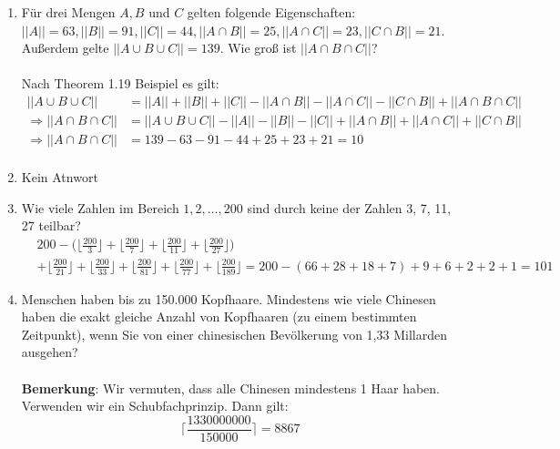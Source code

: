 \begin{enumerate}[label=(\alph*)]
        \item Für drei Mengen $A, B$ und $C$ gelten folgende Eigenschaften: 
        $||A|| = 63, ||B|| = 91, ||C|| = 44, ||A\cap B|| = 25, ||A\cap C|| = 23, ||C \cap B|| = 21$. 
        Außerdem gelte $||A\cup B\cup C|| = 139$. Wie groß ist $||A \cap B \cap C||$?\\\\
        Nach Theorem 1.19 Beispiel es gilt:
        \begin{align*}
	        ||A\cup B\cup C|| &= ||A||+||B||+||C||-||A\cap B||-||A\cap C||-||C \cap B||+||A \cap B \cap C||\\
	        \Rightarrow ||A \cap B \cap C|| &= ||A\cup B\cup C||-||A||-||B||-||C||+||A\cap B||+||A\cap C||+||C \cap B||\\
	        \Rightarrow ||A \cap B \cap C|| &= 139 - 63 - 91 - 44 + 25 + 23 + 21 = 10 \\
        \end{align*}

        \item Kein Atnwort

        \item Wie viele Zahlen im Bereich $1, 2,\ldots, 200$ sind durch keine der Zahlen 3, 7, 11, 27 teilbar?\\
        \begin{align*}
	        &200 - \bigg(\bigg\lfloor\frac{200}{3}\bigg\rfloor + \bigg\lfloor\frac{200}{7}\bigg\rfloor
	         + \bigg\lfloor\frac{200}{11}\bigg\rfloor + \bigg\lfloor\frac{200}{27}\bigg\rfloor \bigg) \\
	         &+  \bigg\lfloor\frac{200}{21}\bigg\rfloor + \bigg\lfloor\frac{200}{33}\bigg\rfloor 
	         + \bigg\lfloor\frac{200}{81}\bigg\rfloor + \bigg\lfloor\frac{200}{77}\bigg\rfloor
	         + \bigg\lfloor\frac{200}{189}\bigg\rfloor
	         = 200 - (66+28+18+7) + 9 + 6 + 2 + 2 + 1= 101
        \end{align*}

        \item Menschen haben bis zu 150.000 Kopfhaare. Mindestens wie viele Chinesen haben die
		exakt gleiche Anzahl von Kopfhaaren (zu einem bestimmten Zeitpunkt), wenn Sie von
		einer chinesischen Bevölkerung von 1,33 Millarden ausgehen?\\\\
		\textbf{Bemerkung}: Wir vermuten, dass alle Chinesen mindestens 1 Haar haben.\\
		Verwenden wir ein Schubfachprinzip. Dann gilt:
		\[\bigg\lceil\frac{1330000000}{150000}\bigg\rceil = 8867\]
    \end{enumerate}
